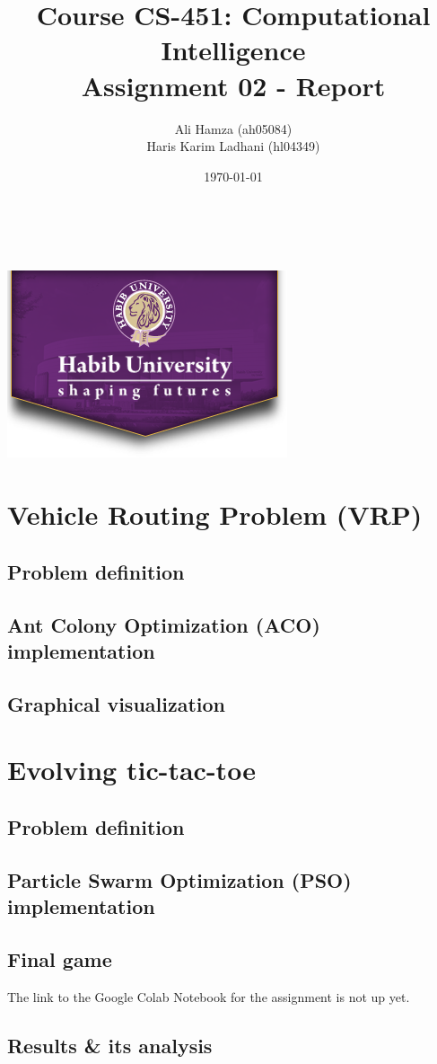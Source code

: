 \documentclass[11pt, letterpaper]{article}
\begin{document}
\title{\large Course CS-451: Computational Intelligence\\[0.5cm]
        \bf\Large Assignment 02 - Report}
\author{\large Ali Hamza (ah05084) \\ Haris Karim Ladhani (hl04349)}
\date{\today}
\makeatletter
    \begin{titlepage}
        \begin{center}
        \vbox{}\vspace{5cm}
            {\@title }\\[3cm] 
            {\@author}\\
            \vfill \includegraphics[scale=0.5]{images/logo.png}\\[1cm]
            {\@date}
        \end{center}
    \end{titlepage}
\makeatother

\newpage

\tableofcontents

\newpage

\section{Vehicle Routing Problem (VRP)}
\subsection{Problem definition}
\subsection{Ant Colony Optimization (ACO) implementation}
\subsection{Graphical visualization}

\section{Evolving tic-tac-toe}
\subsection{Problem definition}
\subsection{Particle Swarm Optimization (PSO) implementation}
\subsection {Final game}
The link to the Google Colab Notebook for the assignment is not up yet.
\subsection {Results \& its analysis}
\end{document}
